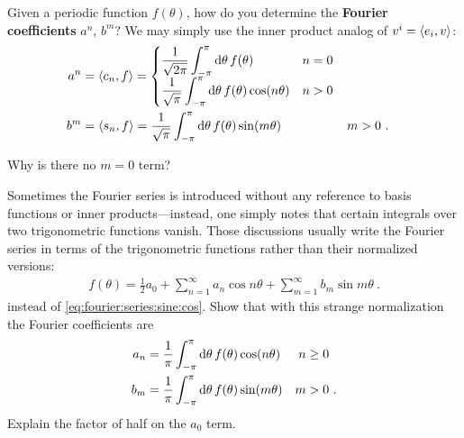\documentclass[12pt, oneside]{report}    %
\begin{document}
Given a periodic function $f(\theta)$, how do you determine the \textbf{Fourier coefficients} $a^{n}$, $b^m$? We may simply use the inner product analog of $v^i = \langle e_i, v\rangle$:
\begin{align}
    a^n &= 
    \langle c_n, f\rangle =
    \begin{cases}
    \displaystyle
    \frac{1}{\sqrt{2\pi}}\int_{-\pi}^\pi
    \operatorname{d}\!{\theta}\, f(\theta) & n= 0
    \\
    \displaystyle
    \frac{1}{\sqrt{\pi}}\int_{-\pi}^\pi
    \operatorname{d}\!{\theta}\, f(\theta) \cos(n\theta) & n> 0
    \end{cases}    
    \\
    b^m &= 
    \langle s_n, f\rangle =
    \frac{1}{\sqrt{\pi}}
    \int_{-\pi}^\pi
    \operatorname{d}\!{\theta}\, f(\theta) \sin(m\theta) 
    & m&> 0
    \ .
\end{align}
\begin{exercise}
Why is there no $m=0$ term? 
\end{exercise}

\begin{exercise}
Sometimes the Fourier series is introduced without any reference to basis functions or inner products---instead, one simply notes that certain integrals over two trigonometric functions vanish. Those discussions usually write the Fourier series in terms of the trigonometric functions rather than their normalized versions:
\begin{align}
    f(\theta) = \frac{1}{2}a_0
    + \sum_{n=1}^\infty a_n \cos n\theta
    + \sum_{m=1}^\infty b_m \sin m\theta \ .
    \label{eq:fourier:series:sine:cos:nonorm}
\end{align}
instead of \eqref{eq:fourier:series:sine:cos}. Show that with this strange normalization the Fourier coefficients are
\begin{align}
    a_n &= \frac{1}{\pi}\int_{-\pi}^\pi
    \operatorname{d}\!{\theta}\, f(\theta) \cos(n\theta) & n&\geq 0
    \\
    b_m &= \frac{1}{\pi}\int_{-\pi}^\pi
    \operatorname{d}\!{\theta}\, f(\theta) \sin(m\theta) 
    & m&> 0
    \ .
\end{align} 
Explain the factor of half on the $a_0$ term.
\end{exercise}
\end{document}
